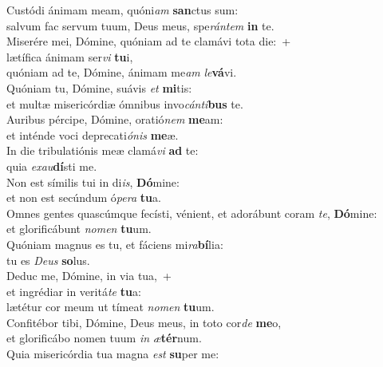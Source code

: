 \evenverse Custódi ánimam meam, quóni\textit{am} \textbf{san}ctus sum:~\*\\
\evenverse salvum fac servum tuum, Deus meus, spe\textit{rán}\textit{tem} \textbf{in} te.\\
\oddverse Miserére mei, Dómine, quóniam ad te clamávi tota die:~+\\
\oddverse  lætífica ánimam ser\textit{vi} \textbf{tu}i,~\*\\
\oddverse quóniam ad te, Dómine, ánimam me\textit{am} \textit{le}\textbf{vá}vi.\\
\evenverse Quóniam tu, Dómine, suávis \textit{et} \textbf{mi}tis:~\*\\
\evenverse et multæ misericórdiæ ómnibus invo\textit{cán}\textit{ti}\textbf{bus} te.\\
\oddverse Auribus pércipe, Dómine, oratió\textit{nem} \textbf{me}am:~\*\\
\oddverse et inténde voci deprecati\textit{ó}\textit{nis} \textbf{me}æ.\\
\evenverse In die tribulatiónis meæ clamá\textit{vi} \textbf{ad} te:~\*\\
\evenverse quia \textit{e}\textit{xau}\textbf{dí}sti me.\\
\oddverse Non est símilis tui in di\textit{is}, \textbf{Dó}mine:~\*\\
\oddverse et non est secúndum ó\textit{pe}\textit{ra} \textbf{tu}a.\\
\evenverse Omnes gentes quascúmque fecísti, vénient, et adorábunt coram \textit{te}, \textbf{Dó}mine:~\*\\
\evenverse et glorificábunt \textit{no}\textit{men} \textbf{tu}um.\\
\oddverse Quóniam magnus es tu, et fáciens mi\textit{ra}\textbf{bí}lia:~\*\\
\oddverse tu es \textit{De}\textit{us} \textbf{so}lus.\\
\evenverse Deduc me, Dómine, in via tua,~+\\
\evenverse  et ingrédiar in veritá\textit{te} \textbf{tu}a:~\*\\
\evenverse lætétur cor meum ut tímeat \textit{no}\textit{men} \textbf{tu}um.\\
\oddverse Confitébor tibi, Dómine, Deus meus, in toto cor\textit{de} \textbf{me}o,~\*\\
\oddverse et glorificábo nomen tuum \textit{in} \textit{æ}\textbf{tér}num.\\
\evenverse Quia misericórdia tua magna \textit{est} \textbf{su}per me:~\*\\
